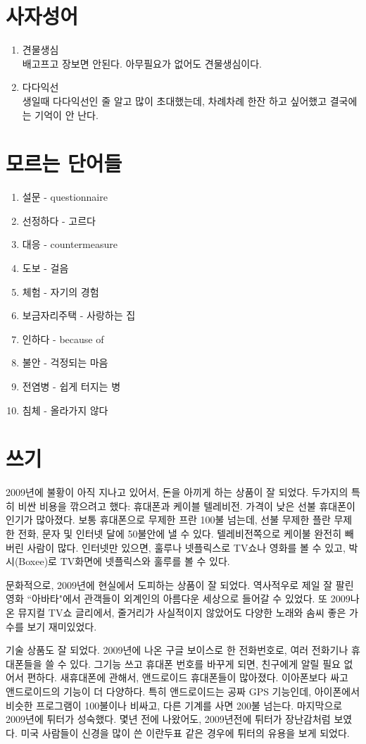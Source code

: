 \documentclass[11pt]{article}
\begin{document}
\section{사자성어}
\begin{enumerate}
  \item 견물생심 \\
배고프고 장보면 안된다. 아무필요가 없어도 견물생심이다.

  \item 다다익선 \\
생일때 다다익선인 줄 알고 많이 초대했는데, 차례차례 한잔 하고 싶어했고 결국에는 기억이 안 난다.
\end{enumerate}

\section{모르는 단어들}
\begin{enumerate}
  \item 설문 - questionnaire
  \item 선정하다 - 고르다
  \item 대응 - countermeasure
  \item 도보 - 걸음
  \item 체험 - 자기의 경험
  \item 보금자리주택 - 사랑하는 집
  \item 인하다 - because of
  \item 불안 - 걱정되는 마음
  \item 전염병 - 쉽게 터지는 병
  \item 침체 - 올라가지 않다
\end{enumerate}

\section{쓰기}
\doublespacing

2009년에 불황이 아직 지나고 있어서, 돈을 아끼게 하는 상품이 잘 되었다. 두가지의 특히 비싼 비용을 깎으려고 했다: 휴대폰과 케이블 텔레비전.  가격이 낮은 선불 휴대폰이 인기가 많아졌다. 보통 휴대폰으로 무제한 프란 100불 넘는데, 선불 무제한 플란 무제한 전화, 문자 및 인터넷 달에 50불안에 낼 수 있다.  텔레비전쪽으로 케이불 완전히 빼버린 사람이 많다.  인터넷만 있으면, 훌루나 넷플릭스로 TV쇼나 영화를 볼 수 있고, 박시(Boxee)로 TV화면에 넷플릭스와 훌루를 볼 수 있다.

문화적으로, 2009년에 현실에서 도피하는 상품이 잘 되었다. 역사적우로 제일 잘 팔린 영화 ``아바타"에서 관객들이 외계인의 아름다운 세상으로 들어갈 수 있었다.  또 2009나온 뮤지컬 TV쇼 글리에서, 줄거리가 사실적이지 않았어도 다양한 노래와 솜씨 좋은 가수를 보기 재미있었다.

기술 상품도 잘 되었다. 2009년에 나온 구글 보이스로 한 전화번호로, 여러 전화기나 휴대폰들을 쓸 수 있다. 그기능 쓰고 휴대폰 번호를  바꾸게 되면, 친구에게 알릴 필요 없어서 편하다.  새휴대폰에 관해서, 앤드로이드 휴대폰들이 많아졌다.  이아폰보다 싸고 앤드로이드의 기능이 더 다양하다. 특히 앤드로이드는 공짜 GPS 기능인데, 아이폰에서 비슷한 프로그램이 100불이나 비싸고, 다른 기계를 사면 200불 넘는다.  마지막으로 2009년에 튀터가 성숙했다. 몇년 전에 나왔어도, 2009년전에 튀터가 장난감처럼 보였다. 미국 사람들이 신경을 많이 쓴 이란두표 같은 경우에 튀터의 유용을 보게 되었다.
\end{document}
